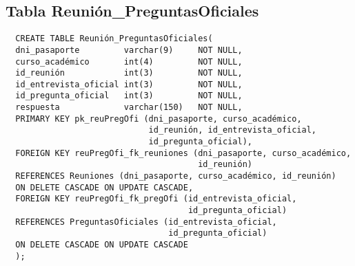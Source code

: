 \subsection{Tabla Reunión\_PreguntasOficiales}

\begin{verbatim}
  CREATE TABLE Reunión_PreguntasOficiales(
  dni_pasaporte         varchar(9)     NOT NULL,
  curso_académico       int(4)         NOT NULL,
  id_reunión            int(3)         NOT NULL,
  id_entrevista_oficial int(3)         NOT NULL,
  id_pregunta_oficial   int(3)         NOT NULL,
  respuesta             varchar(150)   NOT NULL,
  PRIMARY KEY pk_reuPregOfi (dni_pasaporte, curso_académico,
                             id_reunión, id_entrevista_oficial,
                             id_pregunta_oficial),
  FOREIGN KEY reuPregOfi_fk_reuniones (dni_pasaporte, curso_académico,
                                       id_reunión)
  REFERENCES Reuniones (dni_pasaporte, curso_académico, id_reunión)
  ON DELETE CASCADE ON UPDATE CASCADE,
  FOREIGN KEY reuPregOfi_fk_pregOfi (id_entrevista_oficial,
                                     id_pregunta_oficial)
  REFERENCES PreguntasOficiales (id_entrevista_oficial,
                                 id_pregunta_oficial)
  ON DELETE CASCADE ON UPDATE CASCADE
  );
\end{verbatim}